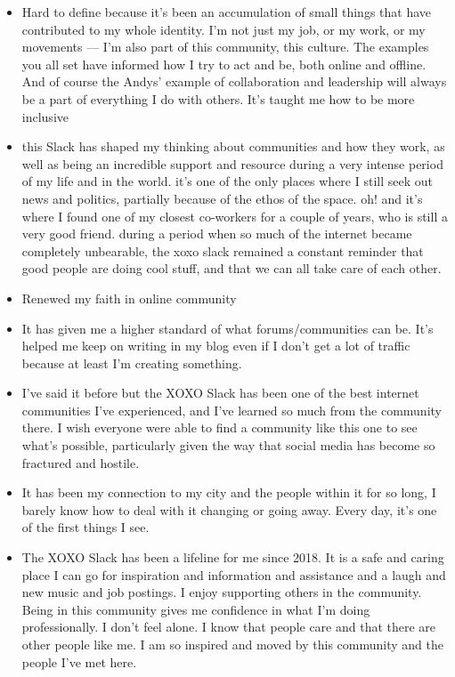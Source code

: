 \documentclass[
]{book}
\providecommand{\tightlist}{%
  \setlength{\itemsep}{0pt}\setlength{\parskip}{0pt}}
\begin{document}
\begin{itemize}
\tightlist
\item
  Hard to define because it's been an accumulation of small things that have contributed to my whole identity. I'm not just my job, or my work, or my movements --- I'm also part of this community, this culture. The examples you all set have informed how I try to act and be, both online and offline. And of course the Andys' example of collaboration and leadership will always be a part of everything I do with others.
  It's taught me how to be more inclusive
\item
  this Slack has shaped my thinking about communities and how they work, as well as being an incredible support and resource during a very intense period of my life and in the world. it's one of the only places where I still seek out news and politics, partially because of the ethos of the space. oh! and it's where I found one of my closest co-workers for a couple of years, who is still a very good friend. during a period when so much of the internet became completely unbearable, the xoxo slack remained a constant reminder that good people are doing cool stuff, and that we can all take care of each other.
\item
  Renewed my faith in online community
\item
  It has given me a higher standard of what forums/communities can be. It's helped me keep on writing in my blog even if I don't get a lot of traffic because at least I'm creating something.
\item
  I've said it before but the XOXO Slack has been one of the best internet communities I've experienced, and I've learned so much from the community there. I wish everyone were able to find a community like this one to see what's possible, particularly given the way that social media has become so fractured and hostile.
\item
  It has been my connection to my city and the people within it for so long, I barely know how to deal with it changing or going away. Every day, it's one of the first things I see.
\item
  The XOXO Slack has been a lifeline for me since 2018. It is a safe and caring place I can go for inspiration and information and assistance and a laugh and new music and job postings. I enjoy supporting others in the community. Being in this community gives me confidence in what I'm doing professionally. I don't feel alone. I know that people care and that there are other people like me. I am so inspired and moved by this community and the people I've met here.
\end{itemize}
\end{document}
